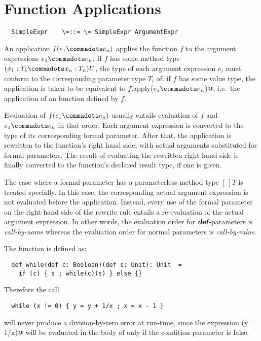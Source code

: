\documentclass[11pt]{report}
\begin{document}
\section{Function Applications}
\label{sec:apply}

\syntax\begin{verbatim}
  SimpleExpr    \=::= \= SimpleExpr ArgumentExpr
\end{verbatim}

An application $f(e_1 \commadots e_n)$ applies the function $f$ to the
argument expressions $e_1 \commadots e_n$. If $f$ has some method type
$(x_1: T_1 \commadots x_n: T_n)U$, the type of each argument
expression $e_i$ must conform to the corresponding parameter type
$T_i$ of. if $f$ has some value type, the application is taken to be
equivalent to \verb@$f$.apply($e_1 \commadots e_n$)@, i.e.\ the
application of an \verb@apply@ function defined by $f$.


Evaluation of $f(e_1 \commadots e_n)$ usually entails evaluation of
$f$ and $e_1 \commadots e_n$ in that order. Each argument expression
is converted to the type of its corresponding formal parameter.  After
that, the application is rewritten to the function's right hand side,
with actual arguments substituted for formal parameters.  The result
of evaluating the rewritten right-hand side is finally converted to
the function's declared result type, if one is given.

The case where a formal parameter has a parameterless method type
$[\,]T$ is treated specially. In this case, the corresponding
actual argument expression is not evaluated before the
application. Instead, every use of the formal parameter on the
right-hand side of the rewrite rule entails a re-evaluation of the
actual argument expression. In other words, the evaluation order for
$\mbox{\sl\bfseries def}$-parameters is {\em call-by-name} whereas the evaluation order
for normal parameters is {\em call-by-value}.

\example The function \verb@while@ is defined as:

\begin{verbatim}
  def while(def c: Boolean)(def s: Unit): Unit  =
    if (c) { s ; while(c)(s) } else {}
\end{verbatim}
Therefore the call
\begin{verbatim}
  while (x != 0) { y = y + 1/x ; x = x - 1 }
\end{verbatim}
will never produce a division-by-zero error at run-time, since the
expression \verb@(y = 1/x)@ will be evaluated in the body of
\verb@while@ only if the condition parameter is false.
\end{document}
